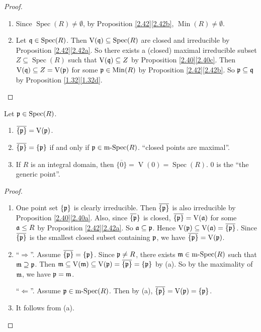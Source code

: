 \begin{proof}
    \begin{enumerate}
        \item Since $\operatorname{Spec}(R) \neq \emptyset$, by Proposition \ref{2.42}\ref{2.42b}, $\operatorname{Min}(R) \neq \emptyset$.
        \item Let $\mathfrak{q} \in \operatorname{Spec}(R)$. Then $\operatorname{V}(\mathfrak{q}) \subseteq \operatorname{Spec}(R)$ are closed and irreducible by Proposition \ref{2.42}\ref{2.42a}. So there exists a (closed) maximal irreducible subset $Z \subseteq \operatorname{Spec}(R)$ such that $\operatorname{V}(\mathfrak{q}) \subseteq Z$ by Proposition \ref{2.40}\ref{2.40c}. Then $\operatorname{V}(\mathfrak{q}) \subseteq Z = \operatorname{V}(\mathfrak{p})$ for some $\mathfrak{p} \in \operatorname{Min}(R)$ by Proposition \ref{2.42}\ref{2.42b}. So $\mathfrak{p} \subseteq \mathfrak{q}$ by Proposition \ref{1.32}\ref{1.32d}. \qedhere
    \end{enumerate}
\end{proof}

\begin{proposition}\label{2.45}
    Let $\mathfrak{p} \in \operatorname{Spec}(R)$.
    \begin{enumerate}
        \item $\overbar {\{\ffp\}} = \operatorname{V}(\ffp)$.
        \item $\overbar {\{\ffp\}} = \{\ffp\}$ if and only if $\mathfrak{p} \in \operatorname{m-Spec}(R)$. ``closed points are maximal''.
        \item If $R$ is an integral domain, then $\overbar {\{0\}} = \operatorname{V}(0) = \operatorname{Spec}(R)$. 0 is the ``the generic point''.
    \end{enumerate}
\end{proposition}

\begin{proof}
    \begin{enumerate}
        \item 
            One point set $\{\mathfrak{p}\}$ is clearly irreducible. Then $\overbar {\{\ffp\}}$ is also irreducible by Proposition \ref{2.40}\ref{2.40a}. Also, since $\overbar {\{\ffp}\}$ is closed, $\overbar {\{\ffp\}} = \operatorname{V}(\ffa)$ for some $\mathfrak{a} \leq R$ by Proposition \ref{2.42}\ref{2.42a}. So $\mathfrak{a} \subseteq \mathfrak{p}$. Hence $\operatorname{V}(\ffp) \subseteq \operatorname{V}(\ffa) = \overbar {\{\ffp\}}$. Since $\overbar {\{\ffp\}}$ is the smallest closed subset containing $\mathfrak{p}$, we have $\overbar {\{\ffp\}} = \operatorname{V}(\ffp)$.
        \item 
            ``$\Rightarrow$''. Assume $\overbar{\{\ffp\}} = \{\ffp\}$. Since $\mathfrak{p} \neq R$, there exists $\mathfrak{m} \in \operatorname{m-Spec}(R)$ such that $\mathfrak{m} \supseteq \mathfrak{p}$. Then $\ffm \subseteq \operatorname{V}(\ffm) \subseteq \operatorname{V}(\ffp) = \overbar {\{\ffp\}} = \{\ffp\}$ by (a). So by the maximality of $\mathfrak{m}$, we have $\mathfrak{p} = \mathfrak{m}$. \par 
            ``$\Leftarrow$''. Assume $\mathfrak{p} \in \operatorname{m-Spec}(R)$. Then by (a), $\overbar {\{\ffp\}} = \operatorname{V}(\ffp) = \{\ffp\}$. 
        \item It follows from (a). \qedhere
    \end{enumerate}
\end{proof}
